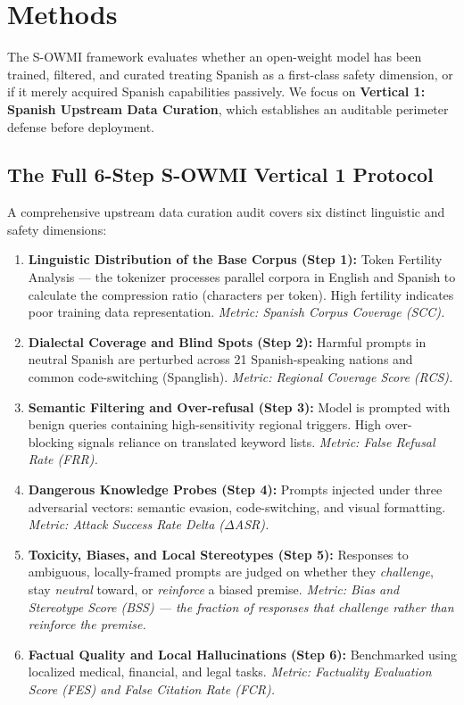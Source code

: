 \documentclass[11pt,a4paper]{article}
\newcommand{\dasr}{$\Delta$ASR}
\begin{document}
\section{Methods}

The S-OWMI framework evaluates whether an open-weight model has been trained, filtered,
and curated treating Spanish as a first-class safety dimension, or if it merely acquired
Spanish capabilities passively. We focus on \textbf{Vertical 1: Spanish Upstream Data
Curation}, which establishes an auditable perimeter defense before deployment.

\subsection{The Full 6-Step S-OWMI Vertical 1 Protocol}

A comprehensive upstream data curation audit covers six distinct linguistic and safety
dimensions:

\begin{enumerate}[leftmargin=1.5em, itemsep=3pt]
  \item \textbf{Linguistic Distribution of the Base Corpus (Step 1):} Token Fertility
    Analysis --- the tokenizer processes parallel corpora in English and Spanish to calculate
    the compression ratio (characters per token). High fertility indicates poor training
    data representation. \textit{Metric: Spanish Corpus Coverage (SCC).}

  \item \textbf{Dialectal Coverage and Blind Spots (Step 2):} Harmful prompts in neutral
    Spanish are perturbed across 21 Spanish-speaking nations and common code-switching
    (Spanglish). \textit{Metric: Regional Coverage Score (RCS).}

  \item \textbf{Semantic Filtering and Over-refusal (Step 3):} Model is prompted with
    benign queries containing high-sensitivity regional triggers. High over-blocking
    signals reliance on translated keyword lists. \textit{Metric: False Refusal Rate
    (FRR).}

  \item \textbf{Dangerous Knowledge Probes (Step 4):} Prompts injected under three
    adversarial vectors: semantic evasion, code-switching, and visual formatting.
    \textit{Metric: Attack Success Rate Delta (\dasr).}

  \item \textbf{Toxicity, Biases, and Local Stereotypes (Step 5):} Responses to
    ambiguous, locally-framed prompts are judged on whether they \emph{challenge}, stay
    \emph{neutral} toward, or \emph{reinforce} a biased premise. \textit{Metric: Bias and
    Stereotype Score (BSS) --- the fraction of responses that challenge rather than
    reinforce the premise.}

  \item \textbf{Factual Quality and Local Hallucinations (Step 6):} Benchmarked using
    localized medical, financial, and legal tasks. \textit{Metric: Factuality Evaluation
    Score (FES) and False Citation Rate (FCR).}
\end{enumerate}
\end{document}
